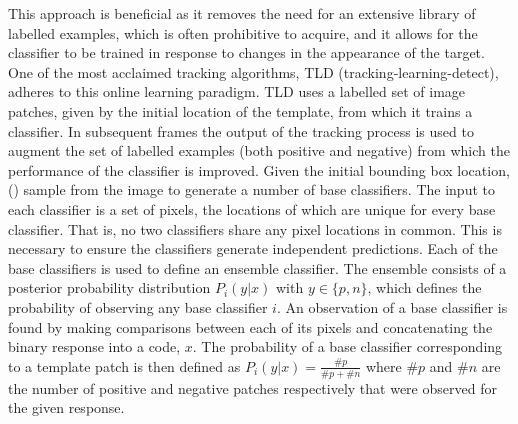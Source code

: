 This approach is beneficial as it removes the need for an extensive library of labelled examples, which is often prohibitive to acquire, and it allows for the classifier to be trained in response to changes in the appearance of the target. One of the most acclaimed tracking algorithms, TLD (tracking-learning-detect), adheres to this online learning paradigm. TLD uses a labelled set of image patches, given by the initial location of the template, from which it trains a classifier. In subsequent frames the output of the tracking process is used to augment the set of labelled examples (both positive and negative) from which the performance of the classifier is improved. Given the initial bounding box location, () sample from the image to generate a number of base classifiers. The input to each classifier is a set of pixels, the locations of which are unique for every base classifier. That is, no two classifiers share any pixel locations in common. This is necessary to ensure the classifiers generate independent predictions. Each of the base classifiers is used to define an ensemble classifier. The ensemble consists of a posterior probability distribution $P_i(y | x)$ with $y \in \{p,n\}$, which defines the probability of observing any base classifier $i$. An observation of a base classifier is found by making comparisons between each of its pixels and concatenating the binary response into a code, $x$. The probability of a base classifier corresponding to a template patch is then defined as $P_i(y|x) = \frac{\#p}{\#p + \#n}$ where $\#p$ and $\#n$ are the number of positive and negative patches respectively that were observed for the given response.\\

